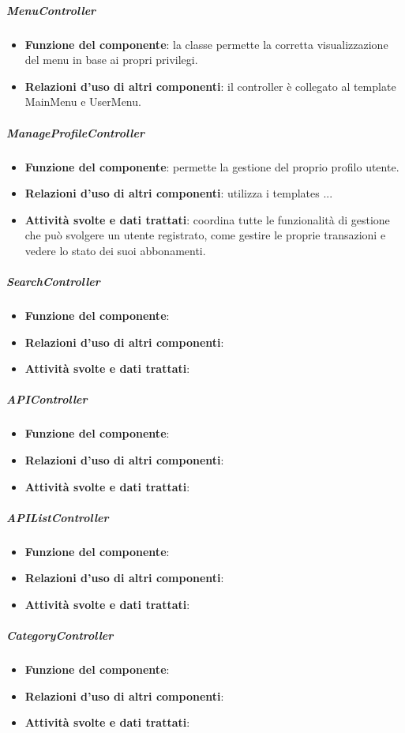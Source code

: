 \subparagraph{MenuController}
\begin{itemize}
	\item \textbf{Funzione del componente}: la classe permette la corretta visualizzazione del menu in base ai propri privilegi.
	\item \textbf{Relazioni d’uso di altri componenti}: il controller è collegato al template MainMenu e UserMenu.
\end{itemize}

\subparagraph{ManageProfileController}
\begin{itemize}
	\item \textbf{Funzione del componente}: permette la gestione del proprio profilo utente.
	\item \textbf{Relazioni d’uso di altri componenti}: utilizza i templates ...
	\item \textbf{Attività svolte e dati trattati}: coordina tutte le funzionalità di gestione che può svolgere un utente registrato, come gestire le proprie transazioni e vedere lo stato dei suoi abbonamenti. 
\end{itemize}

\subparagraph{SearchController}
\begin{itemize}
	\item \textbf{Funzione del componente}: 
	\item \textbf{Relazioni d’uso di altri componenti}: 
	\item \textbf{Attività svolte e dati trattati}: 
\end{itemize}

\subparagraph{APIController}
\begin{itemize}
	\item \textbf{Funzione del componente}: 
	\item \textbf{Relazioni d’uso di altri componenti}: 
	\item \textbf{Attività svolte e dati trattati}: 
\end{itemize}

\subparagraph{APIListController}
\begin{itemize}
	\item \textbf{Funzione del componente}: 
	\item \textbf{Relazioni d’uso di altri componenti}: 
	\item \textbf{Attività svolte e dati trattati}: 
\end{itemize}

\subparagraph{CategoryController}
\begin{itemize}
	\item \textbf{Funzione del componente}: 
	\item \textbf{Relazioni d’uso di altri componenti}: 
	\item \textbf{Attività svolte e dati trattati}: 
\end{itemize}

